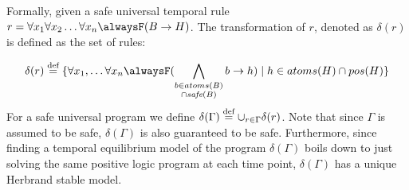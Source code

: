 Formally, given a safe universal temporal rule
$r=\forallx \alwaysF(B \rightarrow H)$. The
transformation of $r$, denoted as $\delta(r)$ is defined as the set of
rules:

\begin{equation*} \delta(r) \defeq \{ \forall x_1, \dots \forall x_n
  \alwaysF(\bigwedge_{\substack{b \in atoms(B)\\ \cap \safe{B}}}b
  \rightarrow h) \mid h \in atoms(H) \cap pos(H)\}
\end{equation*}
For a safe universal program we define
$\delta (\Gamma) \stackrel{\text{def}}{=} \cup_{r \in \Gamma} \delta(r)$. Note that
since $\Gamma$ is assumed to be safe, $\delta(\Gamma)$ is also
guaranteed to be safe. Furthermore, since finding a temporal
equilibrium model of the program $\delta(\Gamma)$ boils down to just
solving the same positive logic program at each time point,
$\delta(\Gamma)$ has a unique Herbrand stable model.

